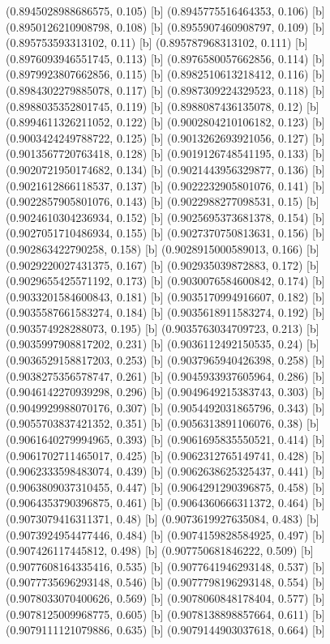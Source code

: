 {{{(0.8945028988686575, 0.105) [b] 
(0.8945775516464353, 0.106) [b] 
(0.8950126210908798, 0.108) [b] 
(0.8955907460908797, 0.109) [b] 
(0.895753593313102, 0.11) [b] 
(0.895787968313102, 0.111) [b] 
(0.8976093946551745, 0.113) [b] 
(0.8976580057662856, 0.114) [b] 
(0.8979923807662856, 0.115) [b] 
(0.8982510613218412, 0.116) [b] 
(0.8984302279885078, 0.117) [b] 
(0.8987309224329523, 0.118) [b] 
(0.8988035352801745, 0.119) [b] 
(0.8988087436135078, 0.12) [b] 
(0.8994611326211052, 0.122) [b] 
(0.9002804210106182, 0.123) [b] 
(0.9003424249788722, 0.125) [b] 
(0.9013262693921056, 0.127) [b] 
(0.9013567720763418, 0.128) [b] 
(0.9019126748541195, 0.133) [b] 
(0.9020721950174682, 0.134) [b] 
(0.9021443956329877, 0.136) [b] 
(0.9021612866118537, 0.137) [b] 
(0.9022232905801076, 0.141) [b] 
(0.9022857905801076, 0.143) [b] 
(0.9022988277098531, 0.15) [b] 
(0.9024610304236934, 0.152) [b] 
(0.9025695373681378, 0.154) [b] 
(0.9027051710486934, 0.155) [b] 
(0.9027370750813631, 0.156) [b] 
(0.902863422790258, 0.158) [b] 
(0.9028915000589013, 0.166) [b] 
(0.9029220027431375, 0.167) [b] 
(0.902935039872883, 0.172) [b] 
(0.9029655425571192, 0.173) [b] 
(0.9030076584600842, 0.174) [b] 
(0.9033201584600843, 0.181) [b] 
(0.9035170994916607, 0.182) [b] 
(0.9035587661583274, 0.184) [b] 
(0.9035618911583274, 0.192) [b] 
(0.903574928288073, 0.195) [b] 
(0.9035763034709723, 0.213) [b] 
(0.9035997908817202, 0.231) [b] 
(0.9036112492150535, 0.24) [b] 
(0.9036529158817203, 0.253) [b] 
(0.9037965940426398, 0.258) [b] 
(0.9038275356578747, 0.261) [b] 
(0.9045933937605964, 0.286) [b] 
(0.9046142270939298, 0.296) [b] 
(0.9049649215383743, 0.303) [b] 
(0.9049929988070176, 0.307) [b] 
(0.9054492031865796, 0.343) [b] 
(0.9055703837421352, 0.351) [b] 
(0.9056313891106076, 0.38) [b] 
(0.9061640279994965, 0.393) [b] 
(0.9061695835550521, 0.414) [b] 
(0.9061702711465017, 0.425) [b] 
(0.9062312765149741, 0.428) [b] 
(0.9062333598483074, 0.439) [b] 
(0.9062638625325437, 0.441) [b] 
(0.9063809037310455, 0.447) [b] 
(0.9064291290396875, 0.458) [b] 
(0.9064353790396875, 0.461) [b] 
(0.9064360666311372, 0.464) [b] 
(0.9073079416311371, 0.48) [b] 
(0.9073619927635084, 0.483) [b] 
(0.9073924954477446, 0.484) [b] 
(0.9074159828584925, 0.497) [b] 
(0.907426117445812, 0.498) [b] 
(0.907750681846222, 0.509) [b] 
(0.9077608164335416, 0.535) [b] 
(0.9077641946293148, 0.537) [b] 
(0.9077735696293148, 0.546) [b] 
(0.9077798196293148, 0.554) [b] 
(0.9078033070400626, 0.569) [b] 
(0.9078060848178404, 0.577) [b] 
(0.9078125009968775, 0.605) [b] 
(0.9078138898857664, 0.611) [b] 
(0.9079111121079886, 0.635) [b] 
(0.9079144903037618, 0.664) [b] 
}}}

